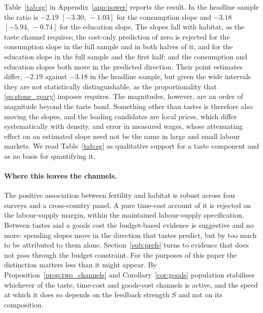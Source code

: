 \documentclass[11pt]{article}
\begin{document}
Table~\ref{tab:sg} in Appendix~\ref{app:power} reports the result. In the headline sample the ratio is
$-2.19$ $[-3.30,\,-1.03]$ for the consumption slope and $-3.18$ $[-5.94,\,-0.74]$ for the education
slope. The slopes fall with habitat, as the taste channel
requires; the cost-only prediction of zero is rejected for the consumption slope in the full sample
and in both halves of it, and for the education slope in the full sample and the first half; and
the consumption and education slopes both move in the predicted direction. Their point
estimates differ, $-2.19$ against $-3.18$ in the headline sample, but given the wide intervals they are
not statistically distinguishable, as the proportionality that \eqref{eq:stone_geary} imposes
requires. The magnitudes, however, are an
order of magnitude beyond the taste band. Something other than tastes is therefore also moving the
slopes, and the leading candidates are local prices, which differ systematically with density, and
error in measured wages, whose attenuating effect on an estimated slope need not be the same in
large and small labour markets. We read Table~\ref{tab:sg} as qualitative support for a taste
component and as no basis for quantifying it.

\paragraph{Where this leaves the channels.}
The positive association between fertility and habitat is robust across four surveys and a
cross-country panel.
A pure time-cost account of it is rejected on the labour-supply margin, within the maintained
labour-supply specification. Between tastes and a goods
cost the budget-based evidence is suggestive and no more: spending slopes move in the direction
that tastes predict, but by too much to be attributed to them alone.
Section~\ref{sub:prefs} turns to evidence that does not pass through the budget constraint.
For the purposes of this paper the distinction matters less than it might appear. By
Proposition~\ref{prop:two_channels} and Corollary~\ref{cor:goods} population stabilises whichever of the
taste, time-cost and goods-cost channels is active, and the speed at which it does so depends on the feedback strength $S$ and not
on its composition.
\end{document}
